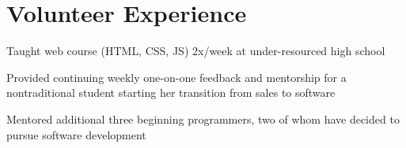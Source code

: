 \documentclass[letterpaper]{deedy-resume} %
\begin{document}
\begin{minipage}[t]{0.66\textwidth}

\section{Volunteer Experience}

%
\begin{tightitemize}
\item Taught web course (HTML, CSS, JS) 2x/week at under-resourced high school
\end{tightitemize}
%
\sectionspace %


%
%


%
\begin{tightitemize}
\item Provided continuing weekly one-on-one feedback and mentorship for a nontraditional student starting her transition from sales to software
\item Mentored additional three beginning programmers, two of whom have decided to pursue software development  
\end{tightitemize}
%
\sectionspace %


\end{minipage}
\end{document}
